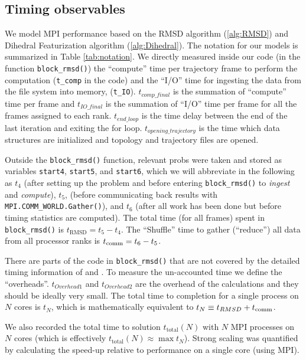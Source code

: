 \label{methods}
\subsection{Timing observables}
We model MPI performance based on the RMSD algorithm (\ref{alg:RMSD}) and Dihedral Featurization algorithm (\ref{alg:Dihedral}). 
The notation for our models is summarized in Table \ref{tab:notation}.
We directly measured inside our code (in the function \texttt{block\_rmsd()}) the ``compute'' time per
trajectory frame to perform the computation (\texttt{t\_comp} in the code) and the ``I/O'' time for
ingesting the data from the file system into memory, (\texttt{t\_IO}). 
$t_{comp\_final}$ is the summation of ``compute'' time per frame and $t_{IO\_final}$ is the summation of ``I/O'' time per frame for all the frames assigned to each rank. 
$t_{end\_loop}$ is the time delay between the end of the last iteration and exiting the for loop.
$t_{opening\_trajectory}$ is the time which data structures are initialized and topology and trajectory files are opened.

Outside the \texttt{block\_rmsd()} function, relevant probs were taken and stored as variables \texttt{start4},
\texttt{start5}, and \texttt{start6}, which we will abbreviate in the following as $t_{4}$ (after setting up the problem
and before entering \texttt{block\_rmsd()} to \emph{ingest} and \emph{compute}), $ t_{5}$, (before communicating back results with
\texttt{MPI.COMM\_WORLD.Gather()}), and $t_{6}$ (after all work has been done but before timing statistics are computed).  
The total time (for all frames) spent in \texttt{block\_rmsd()} is $t_{\text{RMSD}} = t_{5} - t_{4}$. 
The ``Shuffle'' time to gather (``reduce'') all data from all processor ranks is $t_{\text{comm}} = t_{6} - t_{5}$.

There are parts of the code in \texttt{block\_rmsd()} that are not covered by the detailed timing information of \tcomp and \tIO. 
To measure the un-accounted time we define the ``overheads''.
$t_{Overhead1}$ and $t_{Overhead2}$ are the overhead of the calculations and they should be ideally very small.  
The total time to completion for a single process on $N$ cores is $t_{N}$, which is mathematically equivalent to
$t_{N} \equiv t_{RMSD} + t_{\text{comm}}$.

We also recorded the total time to solution $t_{\text{total}}(N)$ with $N$ MPI processes on $N$ cores (which is effectively
$t_{\text{total}}(N) \approx \max t_{N}$). 
Strong scaling was quantified by calculating the speed-up relative to performance on a single core (using MPI).

